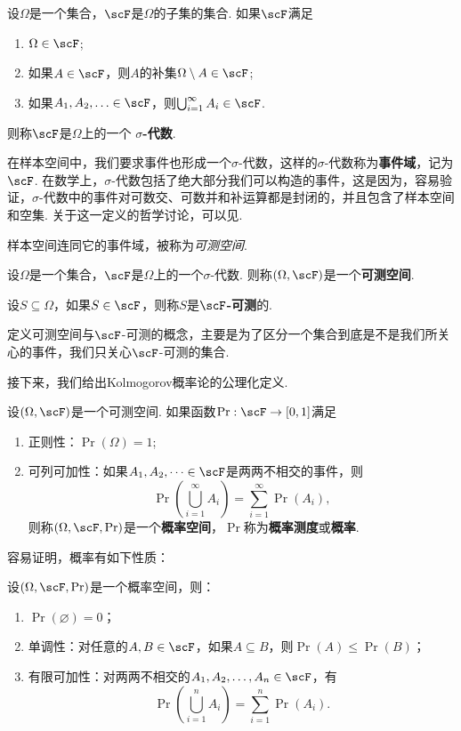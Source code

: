 \begin{definition}[$\sigma$-代数]
设$\Omega$是一个集合，$\scF$是$\Omega$的子集的集合. 如果$\scF$满足
\begin{enumerate}
    \item $\Omega\in\scF$;
    \item 如果$A\in\scF$，则$A$的补集$\Omega\setminus A\in\scF$;
    \item 如果$A_1,A_2,\ldots\in\scF$，则$\bigcup_{i=1}^\infty A_i\in\scF$.
\end{enumerate}
则称$\scF$是$\Omega$上的一个 \textbf{$\sigma$-代数}. 
\end{definition}


在样本空间中，我们要求事件也形成一个$\sigma$-代数，这样的$\sigma$-代数称为\textbf{事件域}，记为$\scF$. 在数学上，$\sigma$-代数包括了绝大部分我们可以构造的事件，这是因为，容易验证，$\sigma$-代数中的事件对可数交、可数并和补运算都是封闭的，并且包含了样本空间和空集. 关于这一定义的哲学讨论，可以见.  

样本空间连同它的事件域，被称为\emph{可测空间}. 

\begin{definition}[可测空间] 
设$\Omega$是一个集合，$\scF$是$\Omega$上的一个$\sigma$-代数. 则称$(\Omega,\scF)$是一个\textbf{可测空间}.

设$S\subseteq\Omega$，如果$S\in\scF$，则称$S$是\textbf{$\scF$-可测}的.
\end{definition}

定义可测空间与$\scF$-可测的概念，主要是为了区分一个集合到底是不是我们所关心的事件，我们只关心$\scF$-可测的集合.

接下来，我们给出Kolmogorov概率论的公理化定义. 

\begin{definition}
设$(\Omega,\scF)$是一个可测空间. 如果函数$\Pr:\scF\to[0,1]$满足
\begin{enumerate}
    \item 正则性：$\Pr(\Omega)=1$;
    \item 可列可加性：如果$A_1,A_2,\dots\in\scF$是两两不相交的事件，则
    \[
        \Pr\left(\bigcup_{i=1}^\infty A_i\right) = \sum_{i=1}^\infty \Pr(A_i),
    \]
    则称$(\Omega,\scF,\Pr)$是一个\textbf{概率空间}，$\Pr$称为\textbf{概率测度}或\textbf{概率}. 
\end{enumerate}
\end{definition}

容易证明，概率有如下性质：
\begin{proposition}
设$(\Omega,\scF,\Pr)$是一个概率空间，则：
\begin{enumerate}
    \item $\Pr(\varnothing)=0$；
    \item 单调性：对任意的$A,B\in\scF$，如果$A\subseteq B$，则$\Pr(A)\leq\Pr(B)$；
    \item 有限可加性：对两两不相交的$A_1,A_2,\dots,A_n\in\scF$，有
    \[
        \Pr\left(\bigcup_{i=1}^n A_i\right) = \sum_{i=1}^n \Pr(A_i).
    \]
\end{enumerate}
\end{proposition}

